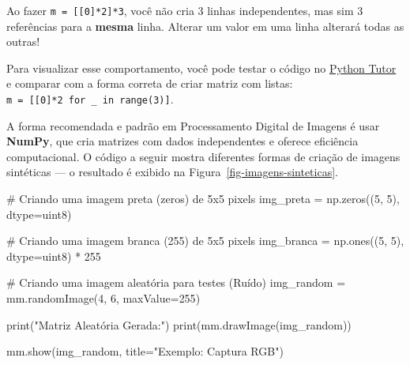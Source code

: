\documentclass[
  portuguese,
  letterpaper,
  openany,
  oneside,
  12pt,
  a4paper]{book}
\newenvironment{Shaded}{\begin{snugshade}}{\end{snugshade}}
\newcommand{\BuiltInTok}[1]{\textcolor[rgb]{0.00,0.23,0.31}{#1}}
\newcommand{\CommentTok}[1]{\textcolor[rgb]{0.37,0.37,0.37}{#1}}
\newcommand{\DecValTok}[1]{\textcolor[rgb]{0.68,0.00,0.00}{#1}}
\newcommand{\NormalTok}[1]{\textcolor[rgb]{0.00,0.23,0.31}{#1}}
\newcommand{\OperatorTok}[1]{\textcolor[rgb]{0.37,0.37,0.37}{#1}}
\newcommand{\StringTok}[1]{\textcolor[rgb]{0.13,0.47,0.30}{#1}}
\begin{document}
\begin{tcolorbox}[enhanced jigsaw, coltitle=black, colback=white, colbacktitle=quarto-callout-warning-color!10!white, bottomtitle=1mm, left=2mm, opacityback=0, breakable, rightrule=.15mm, titlerule=0mm, toptitle=1mm, opacitybacktitle=0.6, title=\textcolor{quarto-callout-warning-color}{\faExclamationTriangle}\hspace{0.5em}{Atenção à cópia de referências}, colframe=quarto-callout-warning-color-frame, arc=.35mm, bottomrule=.15mm, toprule=.15mm, leftrule=.75mm]

Ao fazer \texttt{m\ =\ {[}{[}0{]}*2{]}*3}, você não cria 3 linhas
independentes, mas sim 3 referências para a \textbf{mesma} linha.
Alterar um valor em uma linha alterará todas as outras!

\end{tcolorbox}

Para visualizar esse comportamento, você pode testar o código no
\href{https://pythontutor.com/}{Python Tutor} e comparar com a forma
correta de criar matriz com listas:
\texttt{m\ =\ {[}{[}0{]}*2\ for\ \_\ in\ range(3){]}}.

A forma recomendada e padrão em Processamento Digital de Imagens é usar
\textbf{NumPy}, que cria matrizes com dados independentes e oferece
eficiência computacional. O código a seguir mostra diferentes formas de
criação de imagens sintéticas --- o resultado é exibido na
Figura~\ref{fig-imagens-sinteticas}.

\begin{Shaded}
\begin{Highlighting}[]
\CommentTok{\# Criando uma imagem preta (zeros) de 5x5 pixels}
\NormalTok{img\_preta }\OperatorTok{=}\NormalTok{ np.zeros((}\DecValTok{5}\NormalTok{, }\DecValTok{5}\NormalTok{), dtype}\OperatorTok{=}\StringTok{\textquotesingle{}uint8\textquotesingle{}}\NormalTok{)}

\CommentTok{\# Criando uma imagem branca (255) de 5x5 pixels}
\NormalTok{img\_branca }\OperatorTok{=}\NormalTok{ np.ones((}\DecValTok{5}\NormalTok{, }\DecValTok{5}\NormalTok{), dtype}\OperatorTok{=}\StringTok{\textquotesingle{}uint8\textquotesingle{}}\NormalTok{) }\OperatorTok{*} \DecValTok{255}

\CommentTok{\# Criando uma imagem aleatória para testes (Ruído)}
\NormalTok{img\_random }\OperatorTok{=}\NormalTok{ mm.randomImage(}\DecValTok{4}\NormalTok{, }\DecValTok{6}\NormalTok{, maxValue}\OperatorTok{=}\DecValTok{255}\NormalTok{)}

\BuiltInTok{print}\NormalTok{(}\StringTok{"Matriz Aleatória Gerada:"}\NormalTok{)}
\BuiltInTok{print}\NormalTok{(mm.drawImage(img\_random))}

\NormalTok{mm.show(img\_random, title}\OperatorTok{=}\StringTok{"Exemplo: Captura RGB"}\NormalTok{)}
\end{Highlighting}
\end{Shaded}
\end{document}
